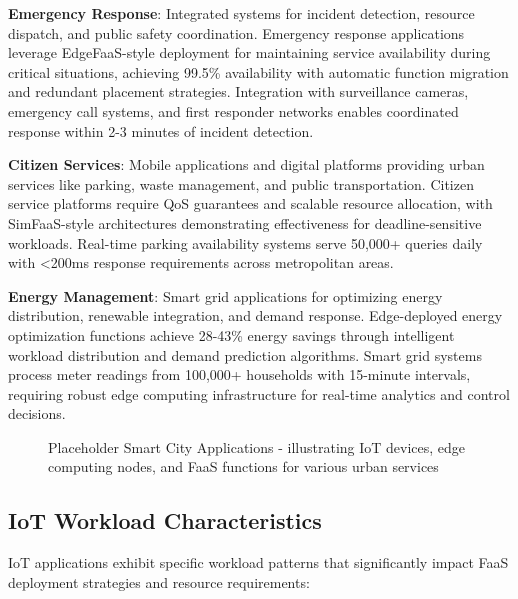 \textbf{Emergency Response}: Integrated systems for incident detection, resource dispatch, and public safety coordination. Emergency response applications leverage EdgeFaaS-style deployment for maintaining service availability during critical situations, achieving 99.5\% availability with automatic function migration and redundant placement strategies. Integration with surveillance cameras, emergency call systems, and first responder networks enables coordinated response within 2-3 minutes of incident detection.

\textbf{Citizen Services}: Mobile applications and digital platforms providing urban services like parking, waste management, and public transportation. Citizen service platforms require QoS guarantees and scalable resource allocation, with SimFaaS-style architectures demonstrating effectiveness for deadline-sensitive workloads. Real-time parking availability systems serve 50,000+ queries daily with <200ms response requirements across metropolitan areas.

\textbf{Energy Management}: Smart grid applications for optimizing energy distribution, renewable integration, and demand response. Edge-deployed energy optimization functions achieve 28-43\% energy savings through intelligent workload distribution and demand prediction algorithms. Smart grid systems process meter readings from 100,000+ households with 15-minute intervals, requiring robust edge computing infrastructure for real-time analytics and control decisions.


\begin{figure}[h]
    \centering
    \caption{\small Placeholder Smart City Applications - illustrating IoT devices, edge computing nodes, and FaaS functions for various urban services}
    \label{fig:smart_city_applications}
\end{figure} 

\subsection{IoT Workload Characteristics}

IoT applications exhibit specific workload patterns that significantly impact FaaS deployment strategies and resource requirements:

